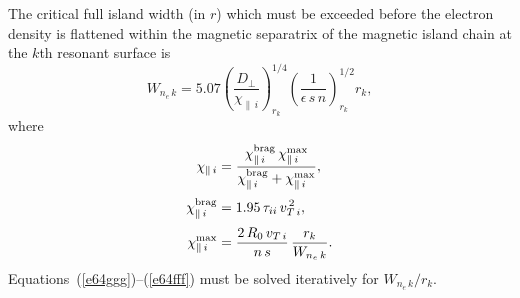 \documentclass[12pt,prb,aps]{revtex4-1}
\begin{document}
The critical full island width (in $r$) which must be exceeded before the electron density is flattened within the
magnetic separatrix of the magnetic island chain at the $k$th resonant surface is
\begin{equation}\label{e64ggg}
W_{n_e\,k}= 5.07\left(\frac{D_\perp}{\chi_{\parallel\,i}}\right)^{1/4}_{r_k}\left(\frac{1}{\epsilon\,s\,n}\right)^{1/2}_{r_k}r_k,
\end{equation}
where 
\begin{align}
\chi_{\parallel\,i}&= \frac{\chi_{\parallel\,i}^{\rm brag}\,\chi_{\parallel\,i}^{\rm max}}{\chi_{\parallel\,i}^{\rm brag}+\chi_{\parallel\,i}^{\rm max}},\\[0.5ex]
\chi_{\parallel\,i}^{\rm brag} &= 1.95\,\tau_{ii}\,v_{T\,i}^{\,2},\\[0.5ex]
\chi_{\parallel\,i}^{\rm max} &= \frac{2\,R_0\,v_{T\,i}}{n\,s}\,\frac{r_k}{W_{n_e\,k}}.\label{e64fff}
\end{align}
Equations~(\ref{e64ggg})--(\ref{e64fff}) must be solved iteratively for $W_{n_e\,k}/r_k$.
\end{document}
